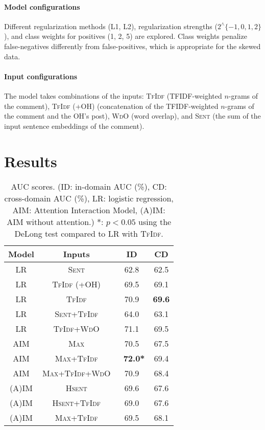 \documentclass[11pt,a4paper]{article}
\newcommand{\hsent}{\textsc{Hsent}}
\newcommand{\tfidf}{\textsc{TfIdf}}
\newcommand{\tfidfoh}{\textsc{TfIdf (+OH)}}
\newcommand{\wdo}{\textsc{WdO}}
\newcommand{\sent}{\textsc{Sent}}
\newcommand{\mmax}{\textsc{Max}}
\newcommand{\IM}{(A)IM}
\begin{document}
\paragraph{Model configurations} Different regularization methods (L1, L2),  regularization strengths ($2^{\wedge}\{-1, 0, 1, 2\}$), and class weights for positives (1, 2, 5) are explored. Class weights penalize false-negatives differently from false-positives, which is appropriate for the skewed data. 

\paragraph{Input configurations} The model takes combinations of the inputs: \tfidf{} (TFIDF-weighted $n$-grams of the comment), \tfidfoh{} (concatenation of the TFIDF-weighted $n$-grams of the comment and the OH's post), \wdo{} (word overlap), and \sent{} (the sum of the input sentence embeddings of the comment).



\section{Results\label{sec:results}}

\begin{table}[t]
    \centering
    \begin{tabularx}{\linewidth}{cccc} \toprule
    Model & Inputs & ID & CD \\ \midrule
    LR & \sent{} & 62.8 & 62.5  \\
    LR & \tfidfoh{} & 69.5 & 69.1  \\
    LR & \tfidf{} & 70.9 & \textbf{69.6}  \\
    LR & \sent{}+\tfidf{} & 64.0 & 63.1 \\ 
    LR & \tfidf{}+\wdo{} & 71.1 & 69.5 \\ \midrule
    AIM & \mmax{} & 70.5 & 67.5 \\
    AIM & \mmax{}+\tfidf{} & \textbf{\ 72.0*} & 69.4 \\ 
    AIM & \mmax{}+\tfidf{}+\wdo{} & 70.9 & 68.4 \\\midrule
    \IM & \hsent{} & 69.6 & 67.6 \\
    \IM & \hsent{}+\tfidf{} & 69.0 & 67.6 \\
    \IM & \mmax{}+\tfidf{} & 69.5 & 68.1 \\ \bottomrule
    \end{tabularx}
    \caption{AUC scores. (ID: in-domain AUC (\%), CD: cross-domain AUC (\%), LR: logistic regression, AIM: Attention Interaction Model, \IM: AIM without attention.) *: $p < 0.05$ using the DeLong test compared to LR with \tfidf{}. \label{tab:baseline_accuracy}}
\end{table}
\end{document}
